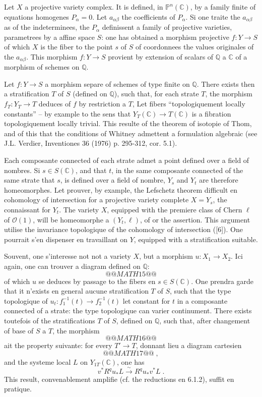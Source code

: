 \documentclass[12pt,a4paper]{article}
\theoremstyle{plain}
\theoremstyle{definition}
\theoremstyle{remark}
\newcommand{\CC}{\mathbb{C}}
\newcommand{\PP}{\mathbb{P}}
\newcommand{\QQ}{\mathbb{Q}}
\newcommand{\cO}{\mathcal{O}}
\begin{document}
Let $X$ a projective variety complex. It is defined, in $\PP^n(\CC)$, by a family finite of equations homogenes $P_{\alpha} = 0$. Let $a_{\alpha\beta}$ the coefficients of $P_{\alpha}$. Si one traite the $a_{\alpha\beta}$ as of the indeterminees, the $P_{\alpha}$ definissent a family of projective varieties, parametrees by a affine space $S$: one has obtained a morphism projective $f: Y \to S$ of which $X$ is the fiber to the point $s$ of $S$ of coordonnees the values originales of the $a_{\alpha\beta}$. This morphism $f: Y \to S$ provient by extension of scalars of $\QQ$ a $\CC$ of a morphism of schemes on $\QQ$.

Let $f: Y \to S$ a morphism separe of schemes of type finite on $\QQ$. There exists then a stratification $T$ of $S$ (defined on $\QQ$), such that, for each strate $T$, the morphism $f_T: Y_T \to T$ deduces of $f$ by restriction a $T$, Let fibers ``topologiquement locally constants'' -- by example to the sens that $Y_T(\CC) \to T(\CC)$ is a fibration topologiquement locally trivial. This resulte of the theorem of isotopie of Thom, and of this that the conditions of Whitney admettent a formulation algebraic (see J.L. Verdier, Inventiones 36 (1976) p. 295-312, cor. 5.1).

Each composante connected of each strate admet a point defined over a field of nombres. Si $s \in S(\CC)$, and that $t$, in the same composante connected of the same strate that $s$, is defined over a field of nombre, $Y_s$ and $Y_t$ are therefore homeomorphes. Let prouver, by example, the Lefschetz theorem difficult en cohomology of intersection for a projective variety complete $X = Y_s$, the connaissant for $Y_t$. The variety $X$, equipped with the premiere class of Chern $\ell$ of $\cO(1)$, will be homeomorphe a $(Y_t, \ell)$, of or the assertion. This argument utilise the invariance topologique of the cohomology of intersection ([6]). One pourrait s'en dispenser en travaillant on $Y$, equipped with a stratification suitable.

Souvent, one s'interesse not not a variety $X$, but a morphism $u: X_1 \to X_2$. Ici again, one can trouver a diagram defined on $\QQ$:
\[
@@MATH15@@
\]
of which $u$ se deduces by passage to the fibers en $s \in S(\CC)$. One prendra garde that it n'exists en general aucune stratification $T$ of $S$, such that the type topologique of $u_t: f_1^{-1}(t) \to f_2^{-1}(t)$ let constant for $t$ in a composante connected of a strate: the type topologique can varier continument. There exists toutefois of the stratifications $T$ of $S$, defined on $\QQ$, such that, after changement of base of $S$ a $T$, the morphism
\[
@@MATH16@@
\]
ait the property suivante: for every $T' \to T$, donnant lieu a diagram cartesien
\[
@@MATH17@@\;,
\]
and the systeme local $L$ on $Y_{1T}(\CC)$, one has
\[
v^*R^qu_*L \xrightarrow{\sim} R^qu_*v^*L\;.
\]
This result, convenablement amplifie (cf. the reductions en 6.1.2), suffit en pratique.
\end{document}
